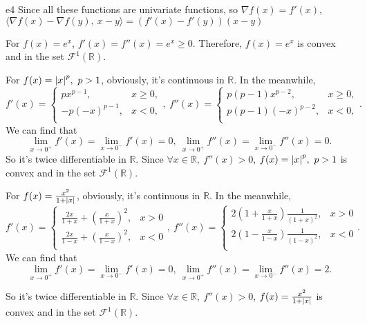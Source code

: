 \documentclass{article}
\newcommand{\R}{\mathbb{R}}
\renewcommand{\grad}{\nabla}
\newcommand{\innerprod}[2]{\langle #1,~#2\rangle}
\begin{document}
\begin{PROOF}{e4}
    Since all these functions are univariate functions, so \(\grad f(x) = f'(x)\), \(\innerprod{\grad f(x) - \grad f(y)}{x-y} = (f'(x) - f'(y))(x - y)\) 
    
    For \(f(x) = e^x\), \(f'(x) = f''(x) = e^x \ge 0\). Therefore, \(f(x) = e^x\) is convex and in the set \(\mathcal{F}^1(\R)\).

    For \(f(x) = \abs{x}^p, ~p > 1\), obviously, it's continuous in \(\R\). In the meanwhile, 
    \[
      f'(x) = \begin{cases}
        px^{p-1}, &x \ge 0,\\
        -p(-x)^{p-1}, &x < 0,\\
      \end{cases}, ~f''(x) = \begin{cases}
        p(p-1)x^{p-2}, &x \ge 0,\\
        p(p-1)(-x)^{p-2}, &x < 0,\\
      \end{cases}.
    \]
    We can find that
    \[
        \lim_{x\to 0^+}f'(x) = \lim_{x\to 0^-}f'(x) = 0,~ \lim_{x\to 0^+}f''(x) = \lim_{x\to 0^-}f''(x) = 0.
    \]
    So it's twice differentiable in \(\R\). Since \(\forall x \in \R,~f''(x) > 0\), \(f(x) = \abs{x}^p,~p > 1\) is convex and in the set \(\mathcal{F}^1(\R)\).
    
    For \(f(x) = \frac{x^2}{1+\abs{x}}\), obviously, it's continuous in \(\R\). In the meanwhile,
    \[
        f'(x) = \begin{cases}
            \frac{2x}{1+x} + \left(\frac{x}{1+x}\right)^2, &x >0\\
            \frac{2x}{1-x} + \left(\frac{x}{1-x}\right)^2, & x< 0\\
        \end{cases},~
        f''(x) = \begin{cases}
            2\left(1 + \frac{x}{1+x}\right)\frac{1}{(1+x)^2}, &x > 0\\
            2\left(1 - \frac{x}{1-x}\right)\frac{1}{(1-x)^2}, &x < 0\\
        \end{cases}.
    \]
    We can find that
    \[
        \lim_{x\to 0^+}f'(x)=\lim_{x\to 0^-}f'(x) = 0,~\lim_{x\to 0^+}f''(x)=\lim_{x\to 0^-}f''(x) = 2.
    \]
    
    So it's twice differentiable in \(\R\). Since \(\forall x \in \R,~f''(x) > 0\), \(f(x) = \frac{x^2}{1+\abs{x}}\) is convex and in the set \(\mathcal{F}^1(\R)\).


\end{PROOF}
\end{document}
